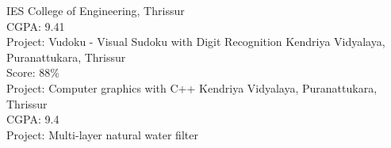 \documentclass[
	a4paper,
]{fortysecondscv}
\begin{document}
\makefrontsidebar

\begin{cvtable}[1.5]
		{IES College of Engineering, Thrissur\\
		CGPA: 9.41\\
		Project: Vudoku - Visual Sudoku with Digit Recognition}
		{Kendriya Vidyalaya, Puranattukara, Thrissur\\
		Score: 88\% \\
		Project: Computer graphics with C++}
		{Kendriya Vidyalaya, Puranattukara, Thrissur\\
		CGPA: 9.4\\
		Project: Multi-layer natural water filter}
\end{cvtable}
\end{document}
